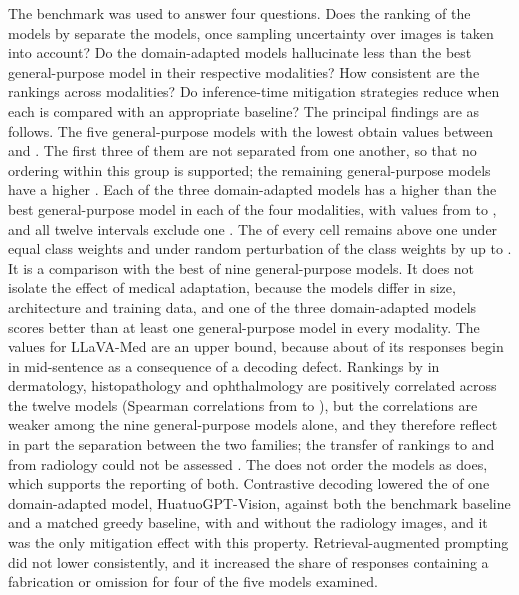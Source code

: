 The benchmark was used to answer four questions. Does the ranking of the models by \SMHR{} separate the models, once sampling uncertainty over images is taken into account? Do the domain-adapted models hallucinate less than the best general-purpose model in their respective modalities? How consistent are the rankings across modalities? Do inference-time mitigation strategies reduce \SMHR{} when each is compared with an appropriate baseline? The principal findings are as follows.
The five general-purpose models with the lowest \SMHR{} obtain values between  and . The first three of them are not separated from one another, so that no ordering within this group is supported; the remaining general-purpose models have a higher \SMHR{}. Each of the three domain-adapted models has a higher \SMHR{} than the best general-purpose model in each of the four modalities, with \SRI{} values from  to , and all twelve intervals exclude one . The \SRI{} of every cell remains above one under equal class weights and under random perturbation of the class weights by up to . It is a comparison with the best of nine general-purpose models. It does not isolate the effect of medical adaptation, because the models differ in size, architecture and training data, and one of the three domain-adapted models scores better than at least one general-purpose model in every modality. The values for LLaVA-Med are an upper bound, because about  of its responses begin in mid-sentence as a consequence of a decoding defect.
Rankings by \SMHR{} in dermatology, histopathology and ophthalmology are positively correlated across the twelve models (Spearman correlations from  to ), but the correlations are weaker among the nine general-purpose models alone, and they therefore reflect in part the separation between the two families; the transfer of rankings to and from radiology could not be assessed \rad{}. The \CHR{} does not order the models as \SMHR{} does, which supports the reporting of both. Contrastive decoding lowered the \SMHR{} of one domain-adapted model, HuatuoGPT-Vision, against both the benchmark baseline and a matched greedy baseline, with and without the radiology images, and it was the only mitigation effect with this property. Retrieval-augmented prompting did not lower \SMHR{} consistently, and it increased the share of responses containing a fabrication or omission for four of the five models examined.

